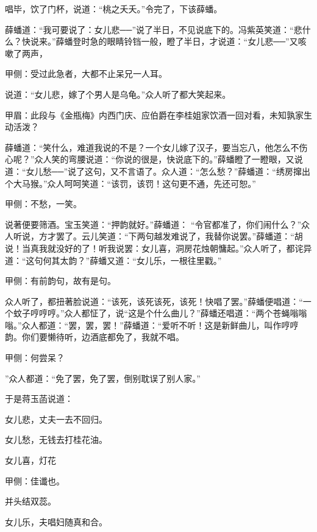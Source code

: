 \begin{parag}
    唱毕，饮了门杯，说道：“桃之夭夭。”令完了，下该薛蟠。
\end{parag}


\begin{parag}
    薛蟠道：“我可要说了：女儿悲──”说了半日，不见说底下的。冯紫英笑道：“悲什么？快说来。”薛蟠登时急的眼睛铃铛一般，瞪了半日，才说道：“女儿悲──”又咳嗽了两声，\begin{note}甲侧：受过此急者，大都不止呆兄一人耳。\end{note}说道：“女儿悲，嫁了个男人是乌龟。”众人听了都大笑起来。\begin{note}甲眉：此段与《金瓶梅》内西门庆、应伯爵在李桂姐家饮酒一回对看，未知孰家生动活泼？\end{note}薛蟠道：“笑什么，难道我说的不是？一个女儿嫁了汉子，要当忘八，他怎么不伤心呢？”众人笑的弯腰说道：“你说的很是，快说底下的。”薛蟠瞪了一瞪眼，又说道：“女儿愁──”说了这句，又不言语了。众人道：“怎么愁？”薛蟠道：“绣房撺出个大马猴。”众人呵呵笑道：“该罚，该罚！这句更不通，先还可恕。”\begin{note}甲侧：不愁，一笑。\end{note}说著便要筛酒。宝玉笑道：“押韵就好。”薛蟠道： “令官都准了，你们闹什么？”众人听说，方才罢了。云儿笑道：“下两句越发难说了，我替你说罢。”薛蟠道：“胡说！当真我就没好的了！听我说罢：女儿喜，洞房花烛朝慵起。”众人听了，都诧异道：“这句何其太韵？”薛蟠又道：“女儿乐，一根往里戳。”\begin{note}甲侧：有前韵句，故有是句。\end{note}众人听了，都扭著脸说道：“该死，该死该死，该死！快唱了罢。”薛蟠便唱道：“一个蚊子哼哼哼。”众人都怔了，说“这是个什么曲儿？”薛蟠还唱道：“两个苍蝇嗡嗡嗡。”众人都道：“罢，罢，罢！”薛蟠道：“爱听不听！这是新鲜曲儿，叫作哼哼韵。你们要懒待听，边酒底都免了，我就不唱。\begin{note}甲侧：何尝呆？\end{note}”众人都道：“免了罢，免了罢，倒别耽误了别人家。”
\end{parag}


\begin{parag}
    于是蒋玉菡说道：
\end{parag}


\begin{poem}
    \begin{pl}女儿悲，丈夫一去不回归。\end{pl}

    \begin{pl}女儿愁，无钱去打桂花油。\end{pl}

    \begin{pl}女儿喜，灯花\end{pl}\begin{note}甲侧：佳谶也。\end{note}\begin{pl}并头结双蕊。\end{pl}

    \begin{pl}女儿乐，夫唱妇随真和合。\end{pl}

\end{poem}


